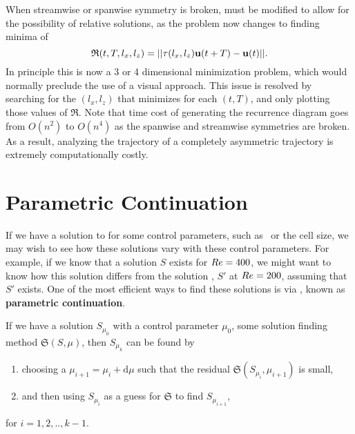  When streamwise or spanwise symmetry is broken,  must be modified to allow for the possibility of relative solutions, as the problem now changes to finding minima of 
 \begin{equation}\label{eq:4DrecurrenceEQ}
 \mathfrak{R}(t,T,l_x,l_z) = ||\tau(l_x,l_z)\mathbf{u}(t+T) - \mathbf{u}(t)||.
  \end{equation}
   In principle this is now a 3 or 4 dimensional minimization problem, which would normally preclude the use of a visual approach. This issue is resolved by searching for the $(l_x,l_z)$ that minimizes  for each $(t,T)$, and only plotting those values of $\mathfrak{R}$. Note that time cost of generating the recurrence diagram goes from $O(n^2)$ to $O(n^4)$ as the spanwise and streamwise symmetries are broken. As a result, analyzing the trajectory of a completely asymmetric trajectory is extremely computationally costly.
 
 \section{Parametric Continuation} 
 
 If we have a solution to  for some control parameters, such as \ReN\ or the cell size, we may wish to see how these solutions vary with these control parameters. For example, if we know that a solution $S$  exists for $Re = 400$, we might want to know how this solution differs from the solution , $S'$ at $Re = 200$, assuming that $S'$ exists. One of the most efficient ways to find these solutions is via , known as {\bf parametric continuation}.
 \begin{algorithm}\label{alg:parCont}
 If we have a solution $S_{\mu_0}$ with a control parameter $\mu_0$,  some solution finding method $\mathfrak{S}(S,\mu)$, then $S_{\mu_k}$ can be found by
 \begin{enumerate}
 \item choosing a $\mu_{i+1} = \mu_{i} + \mathrm{d}\mu$ such that the residual $\mathfrak{S}(S_{\mu_{i}},\mu_{i+1})$ is small,
 \item and then using $S_{\mu_i}$ as a guess for $\mathfrak{S}$ to find $S_{\mu_{i+1}}$,
 \end{enumerate}
 for $i = 1,2,..,k-1$.
 \end{algorithm}

 
 
 